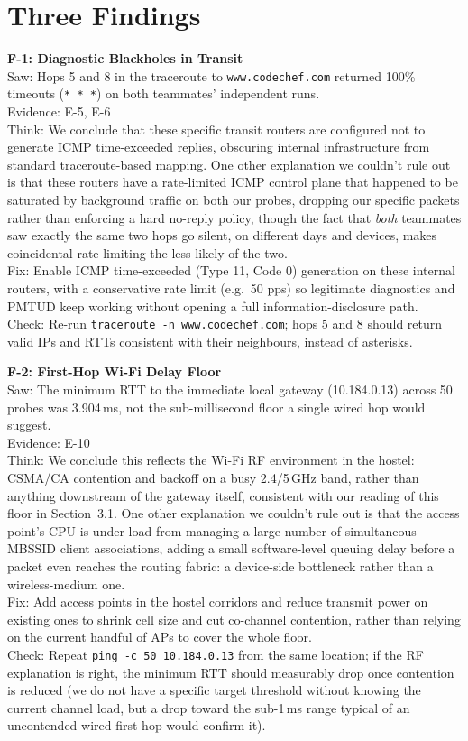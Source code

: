 \chapter{Three Findings}\label{ch:Conclusion}

\textbf{F-1: Diagnostic Blackholes in Transit}\\
Saw: Hops 5 and 8 in the traceroute to \texttt{www.codechef.com} returned 100\% timeouts
(\texttt{* * *}) on both teammates' independent runs.\\
Evidence: E-5, E-6\\
Think: We conclude that these specific transit routers are configured not to generate ICMP
time-exceeded replies, obscuring internal infrastructure from standard traceroute-based mapping.
One other explanation we couldn't rule out is that these routers have a rate-limited ICMP
control plane that happened to be saturated by background traffic on both our probes, dropping
our specific packets rather than enforcing a hard no-reply policy, though the fact that
\emph{both} teammates saw exactly the same two hops go silent, on different days and devices,
makes coincidental rate-limiting the less likely of the two.\\
Fix: Enable ICMP time-exceeded (Type 11, Code 0) generation on these internal routers, with a
conservative rate limit (e.g.\ 50 pps) so legitimate diagnostics and PMTUD keep working without
opening a full information-disclosure path.\\
Check: Re-run \texttt{traceroute -n www.codechef.com}; hops 5 and 8 should return valid IPs and
RTTs consistent with their neighbours, instead of asterisks.

\textbf{F-2: First-Hop Wi-Fi Delay Floor}\\
Saw: The minimum RTT to the immediate local gateway (10.184.0.13) across 50 probes was
3.904\,ms, not the sub-millisecond floor a single wired hop would suggest.\\
Evidence: E-10\\
Think: We conclude this reflects the Wi-Fi RF environment in the hostel: CSMA/CA contention
and backoff on a busy 2.4/5\,GHz band, rather than anything downstream of the gateway itself,
consistent with our reading of this floor in Section~3.1. One other explanation we couldn't rule
out is that the access point's CPU is under load from managing a large number of simultaneous
MBSSID client associations, adding a small software-level queuing delay before a packet even
reaches the routing fabric: a device-side bottleneck rather than a wireless-medium one.\\
Fix: Add access points in the hostel corridors and reduce transmit power on existing ones to
shrink cell size and cut co-channel contention, rather than relying on the current handful of
APs to cover the whole floor.\\
Check: Repeat \texttt{ping -c 50 10.184.0.13} from the same location; if the RF explanation is
right, the minimum RTT should measurably drop once contention is reduced (we do not have a
specific target threshold without knowing the current channel load, but a drop toward the
sub-1\,ms range typical of an uncontended wired first hop would confirm it).

